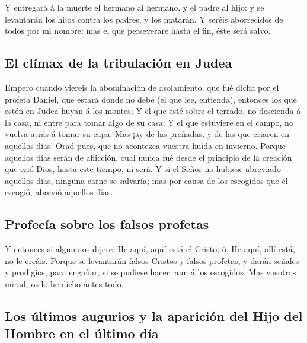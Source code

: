  Y entregará á la muerte el hermano al hermano, y el
padre al hijo: y se levantarán los hijos contra los padres, y los
matarán.  Y seréis aborrecidos de todos por mi nombre:
mas el que perseverare hasta el fin, éste será salvo.

\hypertarget{el-cluxedmax-de-la-tribulaciuxf3n-en-judea}{%
\subsection{El clímax de la tribulación en
Judea}\label{el-cluxedmax-de-la-tribulaciuxf3n-en-judea}}

 Empero cuando viereis la abominación de asolamiento, que
fué dicha por el profeta Daniel, que estará donde no debe (el que lee,
entienda), entonces los que estén en Judea huyan á los montes;
 Y el que esté sobre el terrado, no descienda á la casa,
ni entre para tomar algo de su casa;  Y el que estuviere
en el campo, no vuelva atrás á tomar su capa.  Mas ¡ay de
las preñadas, y de las que criaren en aquellos días! 
Orad pues, que no acontezca vuestra huída en invierno. 
Porque aquellos días serán de aflicción, cual nunca fué desde el
principio de la creación que crió Dios, hasta este tiempo, ni será.
 Y si el Señor no hubiese abreviado aquellos días,
ninguna carne se salvaría; mas por causa de los escogidos que él
escogió, abrevió aquellos días.

\hypertarget{profecuxeda-sobre-los-falsos-profetas}{%
\subsection{Profecía sobre los falsos
profetas}\label{profecuxeda-sobre-los-falsos-profetas}}

 Y entonces si alguno os dijere: He aquí, aquí está el
Cristo; ó, He aquí, allí está, no le creáis.  Porque se
levantarán falsos Cristos y falsos profetas, y darán señales y
prodigios, para engañar, si se pudiese hacer, aun á los escogidos.
 Mas vosotros mirad; os lo he dicho antes todo.

\hypertarget{los-uxfaltimos-augurios-y-la-apariciuxf3n-del-hijo-del-hombre-en-el-uxfaltimo-duxeda}{%
\subsection{Los últimos augurios y la aparición del Hijo del Hombre en
el último
día}\label{los-uxfaltimos-augurios-y-la-apariciuxf3n-del-hijo-del-hombre-en-el-uxfaltimo-duxeda}}

